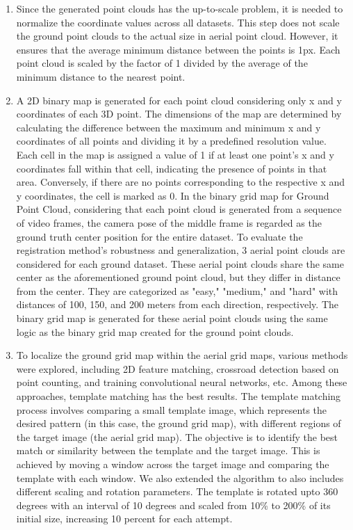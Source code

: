 \documentclass[11pt]{article}
\begin{document}
\begin{enumerate}
        \item Since the generated point clouds has the up-to-scale problem, it is needed to normalize the
        coordinate values across all datasets. This step does not scale the ground point clouds to the actual size
        in aerial point cloud. However, it ensures that the average minimum distance between the points is 1px.
        Each point cloud is scaled by the factor of 1 divided by the average of the minimum distance to the nearest point.

        \item A 2D binary map is generated for each point cloud considering only x and y coordinates of each 3D point.
        The dimensions of the map are determined by calculating the difference between the maximum and minimum x and y
        coordinates of all points and dividing it by a predefined resolution value. Each cell in the map is assigned
        a value of 1 if at least one point's x and y coordinates fall within that cell, indicating the presence of
        points in that area. Conversely, if there are no points corresponding to the respective x and y coordinates,
        the cell is marked as 0. In the binary grid map for Ground Point Cloud, considering that each point cloud is
        generated from a sequence of video frames, the camera pose of the middle frame is regarded as the ground truth
        center position for the entire dataset. To evaluate the registration method's robustness and generalization,
        3 aerial point clouds are considered for each ground dataset. These aerial point clouds share the same center
        as the aforementioned ground point cloud, but they differ in distance from the center. They are categorized
        as "easy," "medium," and "hard" with distances of 100, 150, and 200 meters from each direction, respectively.
        The binary grid map is generated for these aerial point clouds using the same logic as the binary grid map
        created for the ground point clouds.

        \item To localize the ground grid map within the aerial grid maps, various methods were explored, including
        2D feature matching, crossroad detection based on point counting, and training convolutional neural networks,
        etc. Among these approaches, template matching has the best results. The template matching process involves
        comparing a small template image, which represents the desired pattern (in this case, the ground grid map),
        with different regions of the target image (the aerial grid map). The objective is to identify the best match
        or similarity between the template and the target image. This is achieved by moving a window across the target
        image and comparing the template with each window. We also extended the algorithm to also includes different
        scaling and rotation parameters. The template is rotated upto 360 degrees with an interval of 10 degrees and
        scaled from 10\% to 200\% of its initial size, increasing 10 percent for each attempt.

    \end{enumerate}
\end{document}
